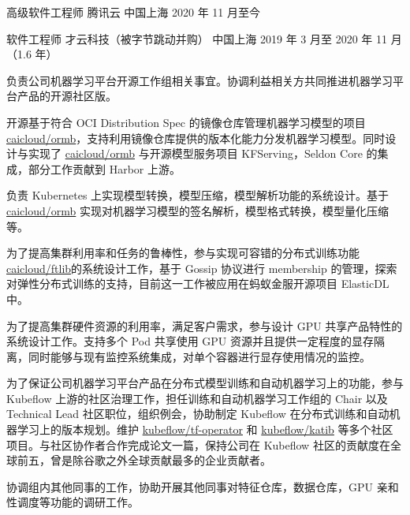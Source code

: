 

\begin{cventries}

  \cventry
    {高级软件工程师} %
    {腾讯云} %
    {中国上海} %
    {2020 年 11 月至今} %
    {
      \begin{cvitems} %
      \end{cvitems}
    }

  \cventry
    {软件工程师} %
    {才云科技（被字节跳动并购）} %
    {中国上海} %
    {2019 年 3 月至 2020 年 11 月（1.6 年）} %
    {
      \begin{cvitems} %
        \item 负责公司机器学习平台开源工作组相关事宜。协调利益相关方共同推进机器学习平台产品的开源社区版。
        \item 开源基于符合 OCI Distribution Spec 的镜像仓库管理机器学习模型的项目 \href{https://github.com/caicloud/ormb}{caicloud/ormb}，支持利用镜像仓库提供的版本化能力分发机器学习模型。同时设计与实现了 \href{https://github.com/caicloud/ormb}{caicloud/ormb} 与开源模型服务项目 KFServing，Seldon Core 的集成，部分工作贡献到 Harbor 上游。
        \item 负责 Kubernetes 上实现模型转换，模型压缩，模型解析功能的系统设计。基于 \href{https://github.com/caicloud/ormb}{caicloud/ormb} 实现对机器学习模型的签名解析，模型格式转换，模型量化压缩等。
        \item 为了提高集群利用率和任务的鲁棒性，参与实现可容错的分布式训练功能 \href{https://github.com/caicloud/ftlib}{caicloud/ftlib}的系统设计工作，基于 Gossip 协议进行 membership 的管理，探索对弹性分布式训练的支持，目前这一工作被应用在蚂蚁金服开源项目 ElasticDL 中。
        \item 为了提高集群硬件资源的利用率，满足客户需求，参与设计 GPU 共享产品特性的系统设计工作。支持多个 Pod 共享使用 GPU 资源并且提供一定程度的显存隔离，同时能够与现有监控系统集成，对单个容器进行显存使用情况的监控。
        \item 为了保证公司机器学习平台产品在分布式模型训练和自动机器学习上的功能，参与 Kubeflow 上游的社区治理工作，担任训练和自动机器学习工作组的 Chair 以及 Technical Lead 社区职位，组织例会，协助制定 Kubeflow 在分布式训练和自动机器学习上的版本规划。维护 \href{https://github.com/kubeflow/tf-operator}{kubeflow/tf-operator} 和 \href{https://github.com/kubeflow/katib}{kubeflow/katib} 等多个社区项目。与社区协作者合作完成论文一篇，保持公司在 Kubeflow 社区的贡献度在全球前五，曾是除谷歌之外全球贡献最多的企业贡献者。
        \item 协调组内其他同事的工作，协助开展其他同事对特征仓库，数据仓库，GPU 亲和性调度等功能的调研工作。
      \end{cvitems}
    }


\end{cventries}
